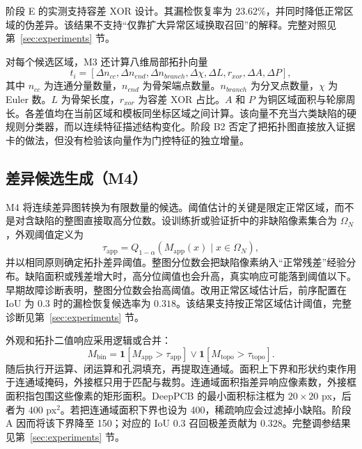 阶段 E 的实测支持容差 XOR 设计。其漏检恢复率为 $23.62\%$，并同时降低正常区域的伪差异。该结果不支持“仅靠扩大异常区域换取召回”的解释。完整对照见第~\ref{sec:experiments} 节。

对每个候选区域，M3 还计算八维局部拓扑向量
\begin{equation}
  t_i=[\Delta n_{cc},\Delta n_{end},\Delta n_{branch},\Delta\chi,
  \Delta L,r_{xor},\Delta A,\Delta P],
  \label{eq:topology-vector}
\end{equation}
其中 $n_{cc}$ 为连通分量数量，$n_{end}$ 为骨架端点数量。$n_{branch}$ 为分叉点数量，$\chi$ 为 Euler 数。$L$ 为骨架长度，$r_{xor}$ 为容差 XOR 占比。$A$ 和 $P$ 为铜区域面积与轮廓周长。各差值均在当前区域和模板同坐标区域之间计算。该向量不充当六类缺陷的硬规则分类器，而以连续特征描述结构变化。阶段 B2 否定了把拓扑图直接放入证据卡的做法，但没有检验该向量作为门控特征的独立增量。

\subsection{差异候选生成（M4）}
\label{subsec:diff-candidates}

M4 将连续差异图转换为有限数量的候选。阈值估计的关键是限定正常区域，而不是对含缺陷的整图直接取高分位数。设训练折或验证折中的非缺陷像素集合为 $\Omega_N$，外观阈值定义为
\begin{equation}
  \tau_{\mathrm{app}}=Q_{1-\alpha}
  \left(M_{\mathrm{app}}(x)\mid x\in\Omega_N\right),
  \label{eq:normal-quantile}
\end{equation}
并以相同原则确定拓扑差异阈值。整图分位数会把缺陷像素纳入“正常残差”经验分布。缺陷面积或残差增大时，高分位阈值也会升高，真实响应可能落到阈值以下。早期故障诊断表明，整图分位数会抬高阈值。改用正常区域估计后，前序配置在 IoU 为 0.3 时的漏检恢复候选率为 $0.318$。该结果支持按正常区域估计阈值，完整诊断见第~\ref{sec:experiments} 节。

外观和拓扑二值响应采用逻辑或合并：
\begin{equation}
  M_{\mathrm{bin}}=
  \mathbf{1}[M_{\mathrm{app}}>\tau_{\mathrm{app}}]
  \lor
  \mathbf{1}[M_{\mathrm{topo}}>\tau_{\mathrm{topo}}].
  \label{eq:candidate-mask}
\end{equation}
随后执行开运算、闭运算和孔洞填充，再提取连通域。面积上下界和形状约束作用于连通域掩码，外接框只用于匹配与裁剪。连通域面积指差异响应像素数，外接框面积指包围这些像素的矩形面积。DeepPCB 的最小面积标注框为 $20\times20$ px，后者为 $400$ px$^2$。若把连通域面积下界也设为 400，稀疏响应会过滤掉小缺陷。阶段 A 因而将该下界降至 150；对应的 IoU 0.3 召回极差贡献为 $0.328$。完整调参结果见第~\ref{sec:experiments} 节。

